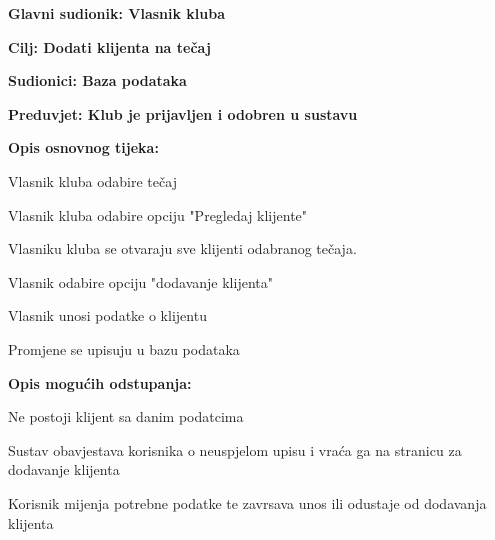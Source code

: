 						\noindent {}
						\begin{packed_item}
							
							\item \textbf{Glavni sudionik: Vlasnik kluba}
							\item  \textbf{Cilj: Dodati klijenta na tečaj} 
							\item  \textbf{Sudionici: Baza podataka}
							\item  \textbf{Preduvjet: Klub je prijavljen i odobren u sustavu}
							\item  \textbf{Opis osnovnog tijeka: }
							
							\item[] \begin{packed_enum}
								
								\item Vlasnik kluba odabire tečaj
								\item Vlasnik kluba odabire opciju "Pregledaj klijente"
								\item Vlasniku kluba se otvaraju sve klijenti odabranog tečaja.
								\item Vlasnik odabire opciju "dodavanje klijenta"
								\item Vlasnik unosi podatke o klijentu
								\item Promjene se upisuju u bazu podataka
							\end{packed_enum}
							
							\item  \textbf{Opis mogućih odstupanja:}
							
							\item[] \begin{packed_item}
								
								\item[2.a] Ne postoji klijent sa danim podatcima
								\item[] \begin{packed_enum}
									
									\item Sustav obavjestava korisnika o neuspjelom upisu i vraća ga na stranicu za dodavanje klijenta
									\item Korisnik mijenja potrebne podatke te zavrsava unos ili odustaje od dodavanja klijenta
									
								\end{packed_enum}
								
							\end{packed_item}
							
						\end{packed_item}
